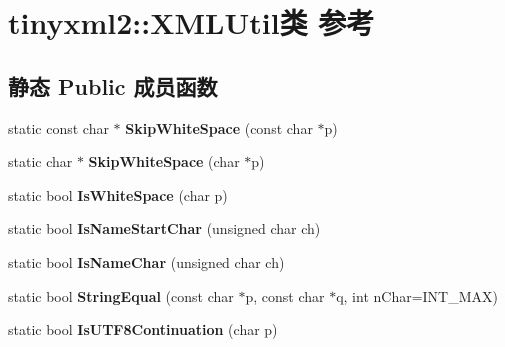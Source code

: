 \hypertarget{classtinyxml2_1_1_x_m_l_util}{}\section{tinyxml2\+:\+:X\+M\+L\+Util类 参考}
\label{classtinyxml2_1_1_x_m_l_util}
\subsection*{静态 Public 成员函数}
\begin{DoxyCompactItemize}
\item 
\mbox{\label{classtinyxml2_1_1_x_m_l_util_a9333d20f2a34325b5115ca45849c4b2a}} 
static const char $\ast$ {\bfseries Skip\+White\+Space} (const char $\ast$p)
\item 
\mbox{\label{classtinyxml2_1_1_x_m_l_util_aa48025be8843ec5a79b65579d31bd8fc}} 
static char $\ast$ {\bfseries Skip\+White\+Space} (char $\ast$p)
\item 
\mbox{\label{classtinyxml2_1_1_x_m_l_util_a357ec3af8fc433d19023a815f45e8e33}} 
static bool {\bfseries Is\+White\+Space} (char p)
\item 
\mbox{\label{classtinyxml2_1_1_x_m_l_util_abe106a69ac4d942a4381a4d9dfd0e0bd}} 
static bool {\bfseries Is\+Name\+Start\+Char} (unsigned char ch)
\item 
\mbox{\label{classtinyxml2_1_1_x_m_l_util_a04b17341538fa11752f24b4301d19485}} 
static bool {\bfseries Is\+Name\+Char} (unsigned char ch)
\item 
\mbox{\label{classtinyxml2_1_1_x_m_l_util_acfcd287cacfd2533e1bc9ea4dfb56602}} 
static bool {\bfseries String\+Equal} (const char $\ast$p, const char $\ast$q, int n\+Char=I\+N\+T\+\_\+\+M\+AX)
\item 
\mbox{\label{classtinyxml2_1_1_x_m_l_util_ad7fd82e0fe610d73ef7bf9f359f104a3}} 
static bool {\bfseries Is\+U\+T\+F8\+Continuation} (char p)
\item 
\mbox{\label{classtinyxml2_1_1_x_m_l_util_ae9bcb2bc3cd6475fdc644c8c17790555}} 

\end{DoxyCompactItemize}
